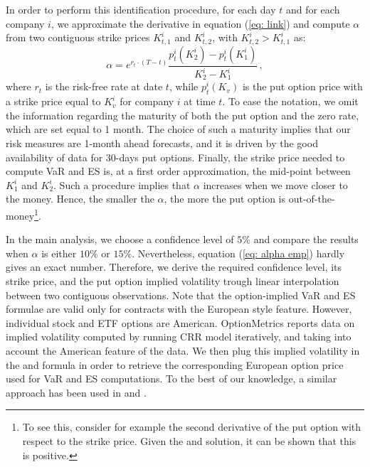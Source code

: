 \documentclass[11pt,a4paper,english]{article}
\begin{document}
In order to perform this identification procedure, for each day $t$ and for each company $i$, we approximate the derivative in equation (\ref{eq: link}) and compute $\alpha$ from two contiguous strike prices $K^i_{t,1}$ and $K^i_{t,2}$, with $K^i_{t,2}>K^i_{t,1}$ as:
\begin{equation}
\label{eq: alpha emp}
\alpha = e^{r_{t}\cdot (T-t)}\frac{p^i_{t}(K^i_2)-p^i_{t}(K^i_1)}{K^i_{2}-K^i_{1}} \, ,
\end{equation}
where $r_{t}$ is the risk-free rate at date $t$, while $p^i_{t}(K_v)$ is the put option price with a strike price equal to $K^i_v$ for company $i$ at time $t$. To ease the notation, we omit the information regarding the maturity of both the put option and the zero rate, which are set equal to 1 month. The choice of such a maturity implies that our risk measures are 1-month ahead forecasts, and it is driven by the good availability of data for 30-days put options. Finally, the strike price needed to compute VaR and ES is, at a first order approximation, the mid-point between $K^i_{1}$ and $K^i_{2}$. Such a procedure implies that $\alpha$ increases when we move closer to the money. Hence, the smaller the $\alpha$, the more the put option is out-of-the-money\footnote{To see this, consider for example the second derivative of the put option with respect to the strike price. Given the \citet{Black1973} and \citet{Merton1973} solution, it can be shown that this is positive.}.

In the main analysis, we choose a confidence level of $5\%$ and compare the results when $\alpha$ is either $10\%$ or $15\%$. Nevertheless, equation (\ref{eq: alpha emp}) hardly gives an exact number. Therefore, we derive the required confidence level, its strike price, and the put option implied volatility trough linear interpolation between two contiguous observations. Note that the option-implied VaR and ES formulae are valid only for contracts with the European style feature. However, individual stock and ETF options are American. OptionMetrics reports data on implied volatility computed by running CRR model iteratively, and taking into account the American feature of the data. We then plug this implied volatility in the \citet{Black1973} and \citet{Merton1973} formula in order to retrieve the corresponding European option price used for VaR and ES computations. To the best of our knowledge, a similar approach has been used in \citet{Christoffersen2015} and \citet{Kelly2016}. 
\end{document}
